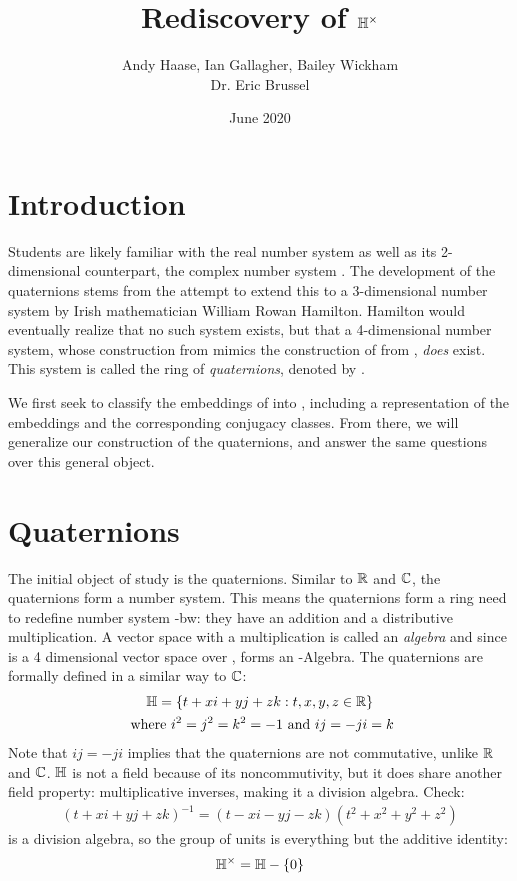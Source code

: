 \documentclass{article}
\title{Rediscovery of $\protect\mathbb{H}^\times$}
\author{Andy Haase, Ian Gallagher, Bailey Wickham \\ Dr. Eric Brussel}
\date{June 2020}
\begin{document}
\maketitle
\section{Introduction}
Students are likely familiar with the real number system \bR as well as its 2-dimensional counterpart, the complex number system \bC. The development of the quaternions stems from the attempt to extend this to a 3-dimensional number system by Irish mathematician William Rowan Hamilton. Hamilton would eventually realize that no such system exists, but that a 4-dimensional number system, whose construction from \bC mimics the construction of \bC from \bR,
{\it does} exist. This system is called the ring of {\it quaternions}, denoted by \bH.

We first seek to classify the embeddings of \bC into \bH, including a representation of the embeddings and the corresponding conjugacy classes. From there, we will generalize our construction of the quaternions, and answer the same questions over this general object.

\section{Quaternions}
The initial object of study is the quaternions. Similar to $\protect\mathbb{R}$ and $\protect\mathbb{C}$, the quaternions form a number system. This means the quaternions form a ring {\color{blue} need to redefine number system -bw}: they have an addition and a distributive multiplication. A vector space with a multiplication is called an \emph{algebra} and since \bH is a 4 dimensional vector space over \bR, \bH forms an \bR -Algebra.
The quaternions are formally defined in a similar way to $\protect\mathbb{C}$:
\begin{gather*}
    \protect\mathbb{H} = \{t + xi + yj + zk : t,x,y,z \in \protect\mathbb{R}\} \\
    \text{ where } i^2 = j^2 = k^2 = -1 \text{ and } ij =-ji = k
\end{gather*}
Note that $ij = -ji$ implies that the quaternions are not commutative, unlike $\protect\mathbb{R}$ and $\protect\mathbb{C}$. $\protect\mathbb{H}$ is not a field because of its noncommutivity, but it does share another field property: multiplicative inverses, making it a division algebra. Check: 
\begin{gather*}
    (t + xi + yj + zk)^{-1}= (t-xi-yj-zk)(t^2 + x^2 + y^2 + z^2)
\end{gather*}
\bH is a division algebra, so the group of units is everything but the additive identity:
\begin{gather*}
    \protect\mathbb{H}^{\times} = \protect\mathbb{H} - \{0\}
\end{gather*}
\end{document}

